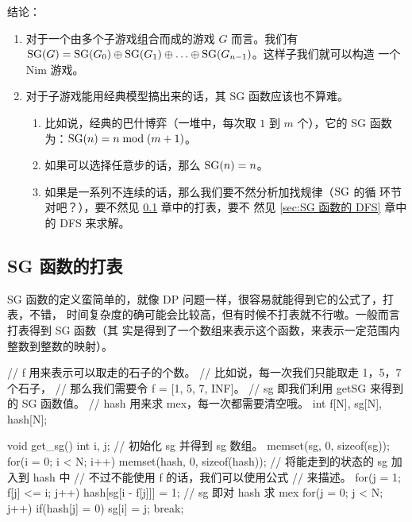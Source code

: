 结论：
\begin{enumerate}
    \item 对于一个由多个子游戏组合而成的游戏 $G$ 而言。我们有 $\mathrm{SG}(G) = \mathrm{SG}(G_0)
        \oplus \mathrm{SG}(G_1) \oplus \ldots \oplus \mathrm{SG}(G_{n-1})$。这样子我们就可以构造
        一个 Nim 游戏。
    \item 对于子游戏能用经典模型搞出来的话，其 SG 函数应该也不算难。
        \begin{enumerate}
            \item 比如说，经典的巴什博弈（一堆中，每次取 $1$ 到 $m$ 个），它的 
                SG 函数为：$\mathrm{SG}(n) = n \bmod (m + 1)$。
            \item 如果可以选择任意步的话，那么 $\mathrm{SG}(n) = n$。
            \item 如果是一系列不连续的话，那么我们要不然分析加找规律（$\mathrm{SG}$ 的循
                环节对吧？），要不然见 \ref{sec:SG 函数的打表} 章中的打表，要不
                然见 \ref{sec:SG 函数的 DFS} 章中的 DFS 来求解。
        \end{enumerate}
\end{enumerate}

\subsection{SG 函数的打表}\label{sec:SG 函数的打表}
SG 函数的定义蛮简单的，就像 DP 问题一样，很容易就能得到它的公式了，打表，不错，
时间复杂度的确可能会比较高，但有时候不打表就不行嗷。一般而言打表得到 SG 函数（其
实是得到了一个数组来表示这个函数，来表示一定范围内整数到整数的映射）。

\begin{Cpp}
// f 用来表示可以取走的石子的个数。
//    比如说，每一次我们只能取走 1，5，7 个石子，
//    那么我们需要令 f = [1, 5, 7, INF]。
// sg 即我们利用 getSG 来得到的 SG 函数值。
// hash 用来求 mex，每一次都需要清空哦。
int f[N], sg[N], hash[N];

void get_sg() {
    int i, j;
    // 初始化 sg 并得到 sg 数组。
    memset(sg, 0, sizeof(sg));
    for(i = 0; i < N; i++) {
        memset(hash, 0, sizeof(hash));
        // 将能走到的状态的 sg 加入到 hash 中
        // 不过不能使用 f 的话，我们可以使用公式
        // 来描述。
        for(j = 1; f[j] <= i; j++)
            hash[sg[i - f[j]]] = 1;
        // sg 即对 hash 求 mex
        for(j = 0; j < N; j++) {
            if(hash[j] = 0) {
                sg[i] = j;
                break;
            }
        }
    }
}
\end{Cpp}

